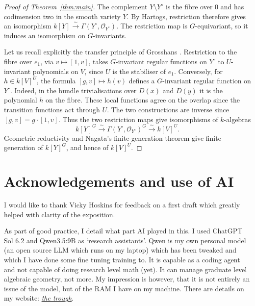 \documentclass[11pt]{amsart}
\theoremstyle{plain}
\numberwithin{equation}{section}
\begin{document}
\begin{proof}[Proof of Theorem~\ref{thm:main}]
The complement \(Y\setminus Y^\circ\) is the fibre over \(0\) and has codimension two in the smooth variety \(Y\).
By Hartogs, restriction therefore gives an isomorphism \(k[Y]\xrightarrow{\sim}\Gamma(Y^\circ,\mathcal O_{Y^\circ})\).
The restriction map is \(G\)-equivariant, so it induces an isomorphism on \(G\)-invariants.

Let us recall explicitly the transfer principle of Grosshans \cite[Section 9]{Grosshans}.
Restriction to the fibre over \(e_1\), via \(v\mapsto[1,v]\), takes
\(G\)-invariant regular functions on \(Y^\circ\) to \(U\)-invariant
polynomials on \(V\), since \(U\) is the stabiliser of \(e_1\).
Conversely, for \(h\in k[V]^U\), the formula \([g,v]\mapsto h(v)\)
defines a \(G\)-invariant regular function on \(Y^\circ\).
Indeed, in the bundle trivialisations over \(D(x)\) and \(D(y)\)
it is the polynomial \(h\) on the fibre. These local functions agree
on the overlap since the transition functions act through \(U\).
The two constructions are inverse since \([g,v]=g\cdot[1,v]\).
Thus the two restriction maps give isomorphisms of \(k\)-algebras
\[
k[Y]^G
\xrightarrow{\sim}\Gamma(Y^\circ,\mathcal O_{Y^\circ})^G
\xrightarrow{\sim}k[V]^U.
\]
Geometric reductivity and Nagata's finite-generation theorem
\cite{Haboush,Nagata} give finite generation of \(k[Y]^G\), and hence
of \(k[V]^U\).
\end{proof}

\section*{Acknowledgements and use of AI}

I would like to thank Vicky Hoskins for feedback on a first draft which greatly helped with clarity of the exposition.

As part of good practice, I detail what part AI played in this.
I used ChatGPT Sol 6.2 and Qwen3.5:9B as `research assistants'.
Qwen is my own personal model (an open source LLM which runs on my laptop) which has been tweaked and which I have done some fine tuning training to.
It is capable as a coding agent and not capable of doing research level math (yet).
It can manage graduate level algebraic geometry, not more.
My impression is however, that it is not entirely an issue of the model, but of the RAM I have on my machine.
There are details on my website: \emph{\href{https://dombunnett.github.io/trough/}{the trough}}.
\end{document}
